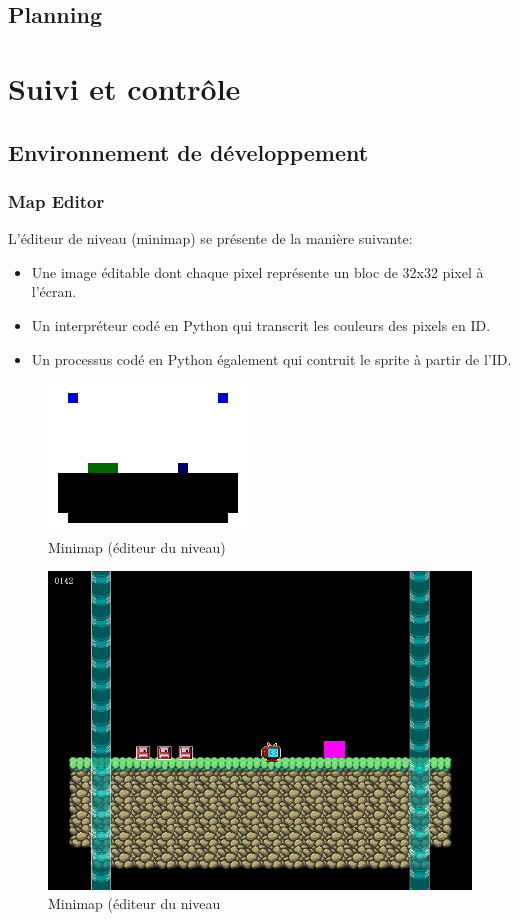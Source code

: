 \documentclass{report}
\begin{document}
		\chapter{Planning}
		
	\part{Suivi et contr\^{o}le}
	\setcounter{chapter}{0}

		\chapter{Environnement de d\'{e}veloppement}
			\section{Map Editor}
L'\'{e}diteur de niveau (minimap) se pr\'{e}sente de la manière suivante:
\begin{itemize}
\item Une image \'{e}ditable dont chaque pixel repr\'{e}sente un bloc de 32x32 pixel à l'\'{e}cran.
\item Un interpr\'{e}teur cod\'{e} en Python qui transcrit les couleurs des pixels en ID.
\item Un processus cod\'{e} en Python \'{e}galement qui contruit le sprite à partir de l'ID.
\end{itemize}

\begin{figure}[h!]
	\caption{\label{Minimap} Minimap (\'{e}diteur du niveau)}
	\includegraphics[scale=1]{minimap_002.png}
	\centering
\end{figure}

\begin{figure}[h!]
	\caption{\label{Minimap} Minimap (\'{e}diteur du niveau}
	\includegraphics[scale=1]{map_001.png}
	\centering
\end{figure}
\end{document}
